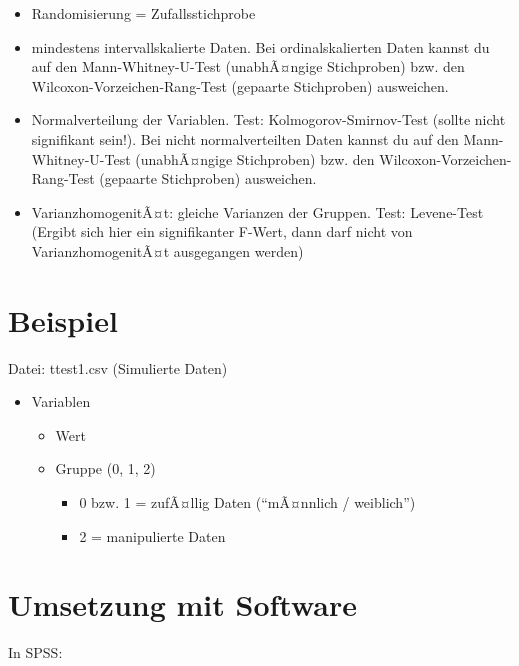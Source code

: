 \documentclass[
]{book}
\providecommand{\tightlist}{%
  \setlength{\itemsep}{0pt}\setlength{\parskip}{0pt}}
\begin{document}
\begin{itemize}
\tightlist
\item
  Randomisierung = Zufallsstichprobe
\item
  mindestens intervallskalierte Daten. Bei ordinalskalierten Daten kannst du auf den Mann-Whitney-U-Test (unabhÃ¤ngige Stichproben) bzw. den Wilcoxon-Vorzeichen-Rang-Test (gepaarte Stichproben) ausweichen.
\item
  Normalverteilung der Variablen. Test: Kolmogorov-Smirnov-Test (sollte nicht signifikant sein!). Bei nicht normalverteilten Daten kannst du auf den Mann-Whitney-U-Test (unabhÃ¤ngige Stichproben) bzw. den Wilcoxon-Vorzeichen-Rang-Test (gepaarte Stichproben) ausweichen.
\item
  VarianzhomogenitÃ¤t: gleiche Varianzen der Gruppen. Test: Levene-Test (Ergibt sich hier ein signifikanter F-Wert, dann darf nicht von VarianzhomogenitÃ¤t ausgegangen werden)
\end{itemize}

\hypertarget{beispiel-1}{%
\section{Beispiel}\label{beispiel-1}}

Datei: ttest1.csv (Simulierte Daten)

\begin{itemize}
\tightlist
\item
  Variablen

  \begin{itemize}
  \tightlist
  \item
    Wert
  \item
    Gruppe (0, 1, 2)

    \begin{itemize}
    \tightlist
    \item
      0 bzw. 1 = zufÃ¤llig Daten (``mÃ¤nnlich / weiblich'')
    \item
      2 = manipulierte Daten
    \end{itemize}
  \end{itemize}
\end{itemize}

\hypertarget{umsetzung-mit-software}{%
\section{Umsetzung mit Software}\label{umsetzung-mit-software}}

In SPSS:
\end{document}
